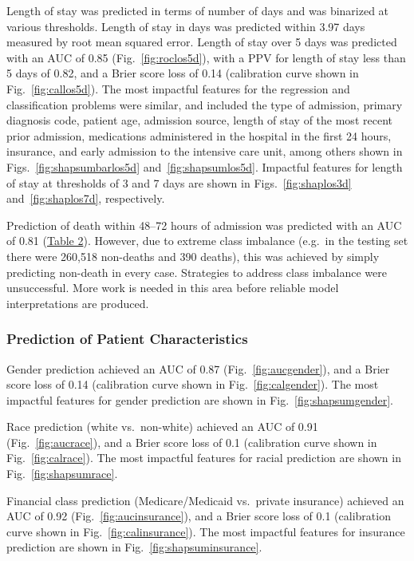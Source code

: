 Length of stay was predicted in terms of number of days and was binarized at various thresholds.\@
Length of stay in days was predicted within 3.97 days measured by root mean squared error.\@
Length of stay over 5 days was predicted with an AUC of 0.85 (Fig.\ \ref{fig:roclos5d}), 
with a PPV for length of stay less than 5 days of 0.82, 
and a Brier score loss of 0.14 (calibration curve shown in Fig.\ \ref{fig:callos5d}).\@ 
The most impactful features for the regression and classification problems were similar, 
and included the type of admission, primary diagnosis code, patient age, admission source, 
length of stay of the most recent prior admission, 
medications administered in the hospital in the first 24 hours, insurance, 
and early admission to the intensive care unit, among others shown in Figs.\ \ref{fig:shapsumbarlos5d} and~\ref{fig:shapsumlos5d}.\@
Impactful features for length of stay at thresholds of 3 and 7 days are shown in %
Figs.\ \ref{fig:shaplos3d} and~\ref{fig:shaplos7d}, respectively.\@ 

Prediction of death within 48--72 hours of admission was predicted with an AUC of 0.81 (\hyperref[table:table2]{Table 2}). 
However, due to extreme class imbalance (e.g.\ in the testing set there were 260,518 non-deaths and 390 deaths), 
this was achieved by simply predicting non-death in every case. Strategies to address class imbalance
were unsuccessful. More work is needed in this area before reliable model interpretations are produced. 

\subsubsection{Prediction of Patient Characteristics}
Gender prediction achieved an AUC of 0.87 (Fig.\ \ref{fig:aucgender}),\@
and a Brier score loss of 0.14 (calibration curve shown in Fig.\ \ref{fig:calgender}).\@
The most impactful features for gender prediction are shown in Fig.\ \ref{fig:shapsumgender}.\@

Race prediction (white vs.\ non-white) achieved an AUC of 0.91 (Fig.\ \ref{fig:aucrace}), 
and a Brier score loss of 0.1 (calibration curve shown in Fig.\ \ref{fig:calrace}).\@
The most impactful features for racial prediction are shown in Fig.\ \ref{fig:shapsumrace}.\@

Financial class prediction (Medicare/Medicaid vs.\ private insurance) achieved an AUC of 0.92 (Fig.\ \ref{fig:aucinsurance}), 
and a Brier score loss of 0.1 (calibration curve shown in Fig.\ \ref{fig:calinsurance}).\@
The most impactful features for insurance prediction are shown in Fig.\ \ref{fig:shapsuminsurance}.\@

